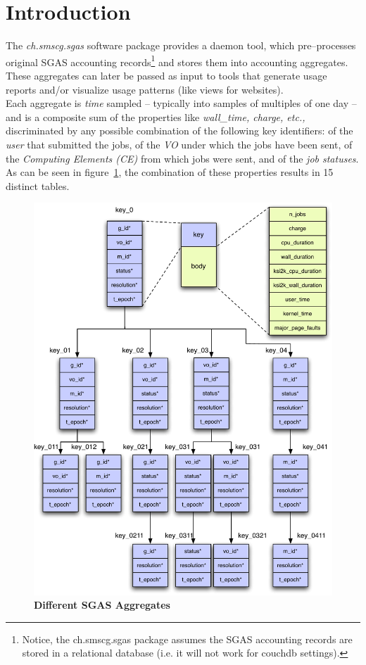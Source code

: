 \section{Introduction}
\label{sec:introduction}

The \emph{ch.smscg.sgas} software package provides a daemon tool, which  pre--processes 
original SGAS accounting records\footnote{Notice, the ch.smscg.sgas package assumes
 the SGAS accounting records  are stored in a relational database 
(i.e. it will not work for couchdb settings).} and stores them into accounting aggregates. These aggregates 
can later be passed as input to tools that generate usage reports and/or visualize usage patterns (like views for websites). \\
Each aggregate is  \emph {time} sampled  -- typically into samples of multiples of one day 
-- and is a composite sum of the properties like \emph{wall\_time, charge, etc.,} discriminated
by any possible combination of the following key identifiers:  of the  \emph{user} that submitted the jobs, 
of the  \emph{VO} under which the jobs have been sent, of the  \emph{Computing 
Elements (CE)} from which jobs were sent,  and of the \emph{job statuses}.  As can be seen in figure~\ref{sgas_aggregates}, 
the combination of these  properties results in 15 distinct tables. \\
\begin{figure}[!htbp]
\begin{center}
\includegraphics [scale=0.8]{figures/sgas_aggregator_tables.pdf}
\caption{{\bf Different SGAS Aggregates}}
\label{sgas_aggregates}
\end{center}
\end{figure}
